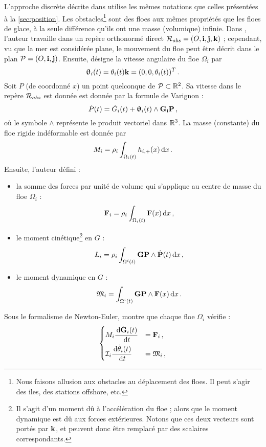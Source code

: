 L'approche discrète décrite dans \parencite{rabatel2015thesis} utilise les mêmes notations que celles présentées à la \cref{sec:position}. Les obstacles\footnote{Nous faisons allusion aux obstacles au déplacement des floes. Il peut s'agir des iles, des stations offshore, etc.} sont des floes aux mêmes propriétés que les floes de glace, à la seule différence qu'ils ont une masse (volumique) infinie. Dans \parencite{rabatel2015thesis}, l'auteur travaille dans un repère orthonormé direct $\mathcal{R}_{abs} = (O, \bm{\mathrm{i}}, \bm{\mathrm{j}}, \bm{\mathrm{k}})$ ; cependant, vu que la mer est considérée plane, le mouvement du floe peut être décrit dans le plan $\mathcal{P} = (O, \bm{\mathrm{i}}, \bm{\mathrm{j}})$. Ensuite, \citeauthor{rabatel2015thesis} désigne la vitesse angulaire du floe $\Omega_i$ par 
$$
\bm{\mathrm{\uptheta}}_i(t) = \theta_i(t)\bm{\mathrm{k}} = (0,0,\theta_i(t))^T \,.
$$
Soit $P$ (de coordonné $x$) un point quelconque de $\mathcal{P} \subset \mathbb{R}^2$. Sa vitesse dans le repère $\mathcal{R}_{abs}$ est donnée est donnée par la formule de Varignon :
$$
\dot{P}(t) = \dot{G}_i(t) + \bm{\uptheta}_i(t) \wedge \bm{\mathrm{G_iP}} \,,
$$
où le symbole $\wedge$ représente le produit vectoriel dans $\mathbb{R}^3$. La masse (constante) du floe rigide indéformable est donnée par 
$$
M_i = \rho_i \int_{\Omega_i(t)} h_{i, +} (x) \diff x \,.
$$
Ensuite, l'auteur défini :
\begin{itemize}
    \item la somme des forces par unité de volume qui s'applique au centre de masse du floe $\Omega_i$ : $$\bvec{F}_i = \rho_i \int_{\Omega_i(t)} \bvec{F}(x) \diff x \,,$$
    \item le moment cinétique\footnote{Il s'agit d'un moment dû à l'accélération du floe ; alors que le moment dynamique est dû aux forces extérieures. Notons que ces deux vecteurs sont portés par $\bm{\mathrm{k}}$, et peuvent donc être remplacé par des scalaires correspondants.} en $G$ : $$L_i = \rho_i \intO{i} \bvec{GP} \wedge \dot{\bvec{P}}(t) \diff x \,,$$
    \item le moment dynamique en $G$ : $$\mathfrak{M}_i = \intO{i} \bvec{GP} \wedge \bvec{F}(x) \diff x \,.$$
\end{itemize}
Sous le formalisme de Newton-Euler, \citeauthor{rabatel2015thesis} montre que chaque floe $\Omega_i$ vérifie :
$$
    \begin{dcases}
        M_i \frac{\diff \dot{\bvec{G}}_i(t)}{\diff t} &= \bvec{F}_i\,, \\
        \mathcal{I}_i \frac{\diff \dot{\theta}_i(t)}{\diff t} &= \mathfrak{M}_i\,,
    \end{dcases}
$$
